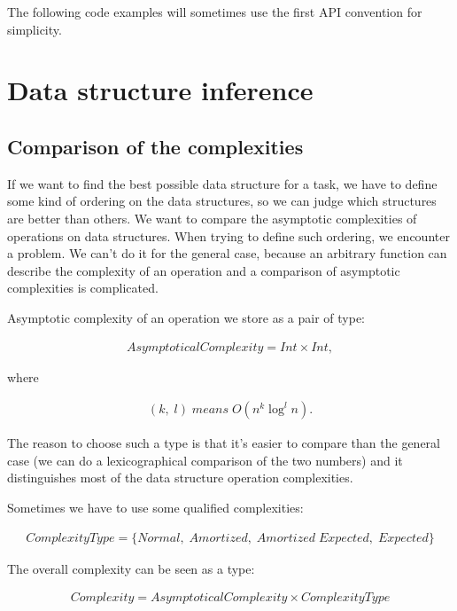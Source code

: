 \documentclass[a4paper,11pt]{article}
\begin{document}
        The following code examples will sometimes use the first API convention for simplicity.

\section{Data structure inference}

	\subsection{Comparison of the complexities}

		If we want to find the best possible data structure for a task, we have to define some kind of ordering
		on the data structures, so we can judge which structures are better than others.  We want to compare the
		asymptotic complexities of operations on data structures. When trying to define such ordering, we
		encounter a problem.  We can't do it for the general case, because an arbitrary function can describe
		the complexity of an operation and a comparison of asymptotic complexities is complicated.

		Asymptotic complexity of an operation we store as a pair of type:

		\begin{eqnarray}
			AsymptoticalComplexity = Int \times Int,
		\end{eqnarray}

		where

		\begin{eqnarray}
			(k, \; l) \; means \; O(n^k \log^l{ n}).
		\end{eqnarray}

		The reason to choose such a type is that it's easier to compare than the general case (we can do a
		lexicographical comparison of the two numbers) and it distinguishes most of the data structure operation
		complexities.

		Sometimes we have to use some qualified complexities:

		\begin{eqnarray}
			ComplexityType = \{ Normal, \; Amortized, \; Amortized \;Expected, \; Expected \}
		\end{eqnarray}

		The overall complexity can be seen as a type:

		\begin{eqnarray}
			Complexity = AsymptoticalComplexity \times ComplexityType
		\end{eqnarray}
\end{document}
